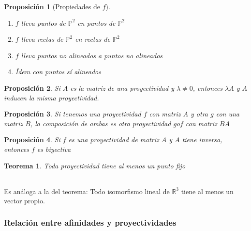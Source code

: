 \documentclass[11pt, a4paper]{article}
\makeatletter
\newif\IfInSansMode
\let\oldsf\sffamily
\renewcommand*{\sffamily}{\oldsf\mathversion{sans}\InSansModetrue}
\let\oldnorm\normalfont
\renewcommand*{\normalfont}{\oldnorm\InSansModefalse\mathversion{normal}}
\renewenvironment{proof}[1][\proofname] {\vspace{-15pt}\par\pushQED{\qed}\normalfont\topsep6\p@\@plus6\p@\relax\trivlist\item[\hskip\labelsep\it#1\@addpunct{.}]\ignorespaces}{\popQED\endtrivlist\@endpefalse}
\newcommand{\R}{\mathbb{R}}
\renewenvironment{proof}[1][\proofname] {\par\pushQED{\qed}\normalfont\topsep6\p@\@plus6\p@\relax\trivlist\item[\hskip\labelsep\itshape\sffamily#1\@addpunct{.}]\ignorespaces}{\popQED\endtrivlist\@endpefalse}
\theoremstyle{theorem-style}
\newtheorem{nth}{Teorema}[section]
\newtheorem{nprop}{Proposición}[section]
\theoremstyle{definition-style}
\theoremstyle{remark-style}
\theoremstyle{example-style}
\newenvironment{nlist}
{\begin{enumerate}
    \renewcommand\labelenumi{(\emph{\roman{enumi})}}}
  {\end{enumerate}}
\makeatother
\begin{document}
\begin{nprop}[Propiedades de $f$]\hfill
	\begin{nlist}
	\item $f$ lleva puntos de $\mathbb P^2$ en puntos de $\mathbb P^2$
	\item $f$ lleva rectas de $\mathbb P^2$ en rectas de $\mathbb P^2$
	\item $f$ lleva puntos no alineados a puntos no alineados
	\item Ídem con puntos sí alineados
\end{nlist}
\end{nprop}

\begin{nprop}
	Si $A$ es la matriz de una proyectividad y $\lambda \ne 0$, entonces $\lambda A$ y $A$ inducen la misma proyectividad.
\end{nprop}

\begin{nprop}
	Si tenemos una proyectividad $f$ con matriz $A$ y otra $g$ con una matriz $B$, la composición de ambas es otra proyectividad $go f$ con matriz $BA$
\end{nprop}

\begin{nprop}
	Si $f$ es una proyectividad de matriz $A$ y $A$ tiene inversa, entonces $f$ es biyectiva
\end{nprop}

\begin{nth}
	Toda proyectividad tiene al menos un punto fijo
\end{nth}
\begin{proof}\hfill\\
Es análoga a la del teorema: Todo isomorfismo lineal de $\R^3$ tiene al menos un vector propio.
\end{proof}
\subsubsection{Relación entre afinidades y proyectividades}
\end{document}
